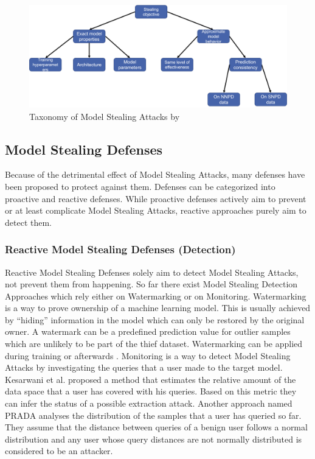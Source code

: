 \begin{figure} [ht]
  \centering
  \includegraphics[width=.9\linewidth]{images/MS_Taxonomy.png}
  \caption[Model Stealing Taxonomy]{Taxonomy of Model Stealing Attacks by \cite{oliynyk2022know}}
  \label{fig:ModelStealing:Taxonomy}
\end{figure}


\subsection{Model Stealing Defenses}
\label{sec:ModelStealing:Defenses}
Because of the detrimental effect of Model Stealing Attacks, many defenses have been proposed to protect against them. Defenses can be categorized into proactive and
reactive defenses. While proactive defenses actively aim to prevent or at least complicate Model Stealing Attacks, reactive approaches purely aim to detect them.

\subsubsection{Reactive Model Stealing Defenses (Detection)}
\label{sec:ModelStealing:Defenses:Detection}
Reactive Model Stealing Defenses solely aim to detect Model Stealing Attacks, not prevent them from happening. So far there exist Model Stealing Detection Approaches which
rely either on Watermarking or on Monitoring. Watermarking is a way to prove ownership of a machine learning model. This is usually achieved by \enquote{hiding} information
in the model which can only be restored by the original owner. A watermark can be a predefined prediction value for outlier samples which are unlikely to be part of the thief
dataset. Watermarking can be applied during training \cite{zhang2018protecting} or afterwards \cite{szyller2021dawn}. Monitoring is a way to detect Model Stealing Attacks by
investigating the queries that a user made to the target model. Kesarwani et al. \cite{kesarwani2018model} proposed a method that estimates the relative amount of the data space that a user has
covered with his queries. Based on this metric they can infer the status of a possible extraction attack. Another approach named PRADA \cite{juuti2019prada} analyses the distribution of the
samples that a user has queried so far. They assume that the distance between queries of a benign user follows a normal distribution and any user whose query distances are not normally
distributed is considered to be an attacker. \\


